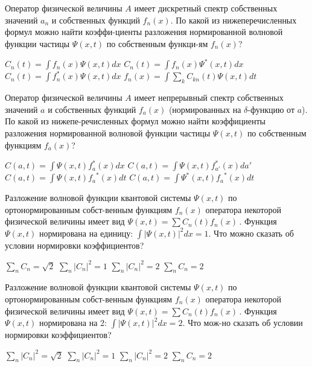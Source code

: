 \documentclass[11pt,a4paper]{exam}
\begin{document}
\begin{questions}
\question Оператор физической величины $A$ имеет дискретный спектр собственных значений ${a_n}$ и собственных функций ${f_n}(x)$. По какой из нижеперечисленных формул можно найти коэффи-циенты разложения нормированной волновой функции частицы $\Psi (x,t)$ по собственным функци-ям ${f_n}(x)$?
\begin{choices}
\choice ${C_n}(t) = \int {{f_n}(x)\Psi (x,t)dx} $        
\choice ${C_n}(t) = \int {{f_n}(x){\Psi ^*}(x,t)dx} $
\choice ${C_n}(t) = \int {f_n^*(x)\Psi (x,t)dx} $        
\choice ${f_n}(x) = \int {\sum\limits_k {{C_{kn}}(t)\Psi (x,t)} } dt$
\end{choices}

\question Оператор физической величины $A$ имеет непрерывный спектр собственных значений $a$ и собственных функций ${f_a}(x)$ (нормированных на $\delta $-функцию от $a$). По какой из нижепе-речисленных формул можно найти коэффициенты разложения нормированной волновой функции частицы $\Psi (x,t)$ по собственным функциям ${f_a}(x)$?
\begin{choices}
\choice $C(a,t) = \int {\Psi (x,t)f_a^*(x)dx} $    
\choice $C(a,t) = \int {\Psi (x,t)f_{a'}^*(x)da'} $
\choice $C(a,t) = \int {\Psi (x,t){f_a}^*(x)dt} $     
\choice $C(a,t) = \int {{\Psi ^*}(x,t){f_a}^*(x)dt} $
\end{choices}

\question Разложение волновой функции квантовой системы $\Psi (x,t)$ по ортонормированным собст-венным функциям ${f_n}(x)$ оператора некоторой физической величины имеет вид $\Psi (x,t) = \sum {{C_n}(t)} {f_n}(x)\,$. Функция $\Psi (x,t)$ нормирована на единицу: $\int {|\Psi (x,t){|^2}dx = 1} $. Что можно сказать об условии нормировки коэффициентов?
\begin{choices}
\choice $\sum\limits_n {{C_n}}  = \sqrt 2 $     
\choice ${\sum\limits_n {\left| {{C_n}} \right|} ^2} = 1$         
\choice ${\sum\limits_n {\left| {{C_n}} \right|} ^2} = 2$      
\choice $\sum\limits_n {{C_n}}  = 2$
\end{choices}

\question Разложение волновой функции квантовой системы $\Psi (x,t)$ по ортонормированным собст-венным функциям ${f_n}(x)$ оператора некоторой физической величины имеет вид $\Psi (x,t) = \sum {{C_n}(t)} {f_n}(x)\,$. Функция $\Psi (x,t)$ нормирована на 2: $\int {|\Psi (x,t){|^2}dx = 2} $. Что мож-но сказать об условии нормировки коэффициентов?
\begin{choices}
\choice ${\sum\limits_n {\left| {{C_n}} \right|} ^2} = \sqrt 2 $     
\choice ${\sum\limits_n {\left| {{C_n}} \right|} ^2} = 1$         
\choice ${\sum\limits_n {\left| {{C_n}} \right|} ^2} = 2$      
\choice $\sum\limits_n {{C_n}}  = 2$
\end{choices}


\end{questions}
\end{document}
